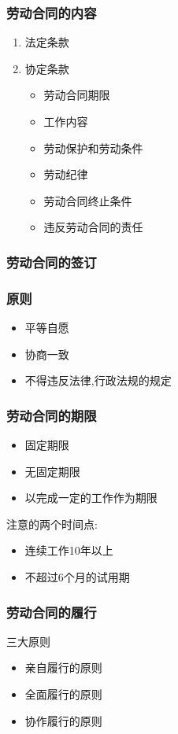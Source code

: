\documentclass{ctexart}
\begin{document}
\subsubsection{劳动合同的内容}
\label{sec-3-2-2}
\begin{enumerate}
\item 法定条款
\label{sec-3-2-2-1}
\item 协定条款
\label{sec-3-2-2-2}
\begin{itemize}
\item 劳动合同期限
\item 工作内容
\item 劳动保护和劳动条件
\item 劳动纪律
\item 劳动合同终止条件
\item 违反劳动合同的责任
\end{itemize}
\end{enumerate}
\subsubsection{劳动合同的签订}
\label{sec-3-2-3}
\subsubsection{原则}
\label{sec-3-2-4}
\begin{itemize}
\item 平等自愿
\item 协商一致
\item 不得违反法律,行政法规的规定
\end{itemize}
\subsubsection{劳动合同的期限}
\label{sec-3-2-5}
\begin{itemize}
\item 固定期限
\item 无固定期限
\item 以完成一定的工作作为期限
\end{itemize}
注意的两个时间点:
\begin{itemize}
\item 连续工作10年以上
\item 不超过6个月的试用期
\end{itemize}
\subsubsection{劳动合同的履行}
\label{sec-3-2-6}
三大原则
\begin{itemize}
\item 亲自履行的原则
\item 全面履行的原则
\item 协作履行的原则
\end{itemize}
\end{document}
